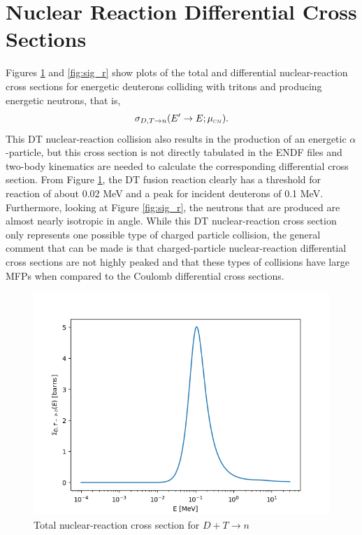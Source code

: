 \section{Nuclear Reaction Differential Cross Sections}
Figures \ref{fig:sig_rt} and \ref{fig:sig_r} show plots of the total and differential nuclear-reaction cross sections for energetic deuterons colliding with tritons and producing energetic neutrons, that is, 
\begin{equation}
    \sigma_{D,T \rightarrow n}(E^{\prime} \rightarrow E; \mucm).
\end{equation}
This DT nuclear-reaction collision also results in the production of an energetic $\alpha$-particle, but this cross section is not directly tabulated in the ENDF files and two-body kinematics are needed to calculate the corresponding differential cross section. From Figure \ref{fig:sig_rt}, the DT fusion reaction clearly has a threshold for reaction of about 0.02 MeV and a peak for incident deuterons of 0.1 MeV. Furthermore, looking at Figure \ref{fig:sig_r}, the neutrons that are produced are almost nearly isotropic in angle. While this DT nuclear-reaction cross section only represents one possible type of charged particle collision, the general comment that can be made is that charged-particle nuclear-reaction differential cross sections are not highly peaked and that these types of collisions have large MFPs when compared to the Coulomb differential cross sections.

\begin{figure}[!htb]
    \centering
    \includegraphics[scale=0.75]{../figures/boltzmann_model/DT_TotalReactionXS.png}
    \caption{Total nuclear-reaction cross section for $D+T \rightarrow n$}
    \label{fig:sig_rt}
\end{figure}

